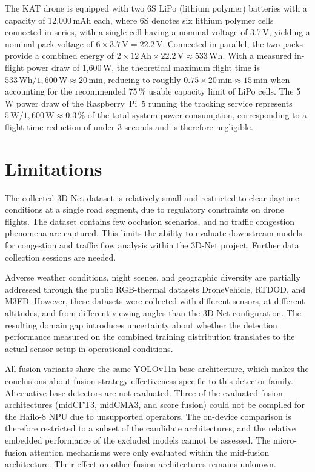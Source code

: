 \documentclass[12pt,oneside,bibtotoc,liststotoc]{scrbook}
\begin{document}
The KAT drone is equipped with two 6S LiPo (lithium polymer) batteries with a capacity of
12{,}000\,mAh each, where 6S denotes six lithium polymer cells connected in series, with a
single cell having a nominal voltage of 3.7\,V, yielding a nominal pack voltage of
$6 \times 3.7\,\text{V} = 22.2\,\text{V}$. Connected in parallel, the two packs provide a
combined energy of $2 \times 12\,\text{Ah} \times 22.2\,\text{V} \approx 533\,\text{Wh}$.
With a measured in-flight power draw of 1{,}600\,W, the theoretical maximum flight time is
$533\,\text{Wh} / 1{,}600\,\text{W} \approx 20\,\text{min}$, reducing to roughly
$0.75 \times 20\,\text{min} \approx 15\,\text{min}$ when accounting for the recommended
75\,\% usable capacity limit of LiPo cells. The 5\,W power draw of the Raspberry~Pi~5 running the tracking service
represents $5\,\text{W} / 1{,}600\,\text{W} \approx 0.3\,\%$ of the total system power
consumption, corresponding to a flight time reduction of under 3 seconds and is therefore
negligible.


\newpage
\chapter{Limitations}
\label{chap:limitations}

The collected 3D-Net dataset is relatively small and restricted to clear daytime conditions
at a single road segment, due to regulatory constraints on drone flights. The dataset
contains few occlusion scenarios, and no traffic congestion phenomena are captured. This
limits the ability to evaluate downstream models for congestion and traffic flow analysis
within the 3D-Net project. Further data collection sessions are needed.

Adverse weather conditions, night scenes, and geographic diversity are partially addressed through the
public RGB-thermal datasets DroneVehicle, RTDOD, and M3FD. However, these datasets were
collected with different sensors, at different altitudes, and from different viewing angles
than the 3D-Net configuration. The resulting domain gap introduces uncertainty about
whether the detection performance measured on the combined training distribution translates
to the actual sensor setup in operational conditions.

All fusion variants share the same YOLOv11n base architecture, which makes the conclusions about
fusion strategy effectiveness specific to this detector family. Alternative base
detectors are not evaluated. Three of the evaluated fusion architectures (midCFT3, midCMA3,
and score fusion) could not be compiled for the Hailo-8 NPU due to unsupported operators.
The on-device comparison is therefore restricted to a subset of the candidate architectures,
and the relative embedded performance of the excluded models cannot be assessed.
The micro-fusion attention mechanisms were only evaluated within the mid-fusion architecture.
Their effect on other fusion architectures remains unknown.
\end{document}
